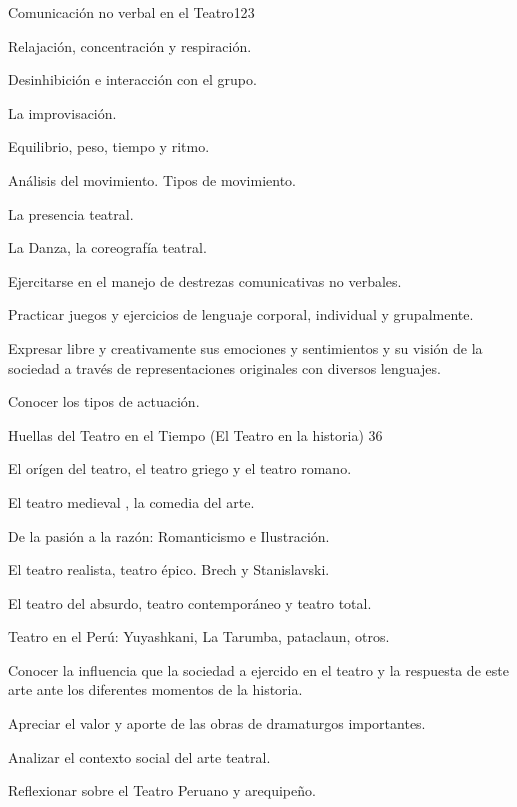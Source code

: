 \begin{syllabus}
\begin{unit}{Comunicación no verbal en el Teatro}{}{12}{3}
\begin{topics}
	\item Relajación, concentración y respiración.
	\item Desinhibición e interacción con el grupo.
	\item La improvisación. 
	\item Equilibrio, peso, tiempo y ritmo. 
	\item Análisis del movimiento. Tipos de movimiento.
	\item La presencia teatral.
	\item La Danza, la coreografía teatral.     

\end{topics}
\begin{learningoutcomes}
	\item Ejercitarse en el manejo de destrezas comunicativas no verbales.
	\item Practicar juegos y ejercicios de lenguaje  corporal, individual y grupalmente.
	\item Expresar libre y creativamente sus emociones y sentimientos y su visión de la sociedad  a través de representaciones originales con diversos lenguajes. 
	\item Conocer los tipos de actuación.
\end{learningoutcomes}
\end{unit}

\begin{unit}{Huellas del Teatro en el Tiempo  (El Teatro en la historia) }{}{3}{6}
\begin{topics}
	\item El orígen del teatro, el teatro griego y el teatro romano.
	\item El teatro medieval , la comedia del arte.
	\item De la pasión a la razón: Romanticismo e Ilustración.
	\item El teatro realista, teatro épico. Brech  y  Stanislavski.
	\item El teatro del absurdo, teatro contemporáneo y teatro total.
	\item Teatro en el Perú: Yuyashkani, La Tarumba, pataclaun, otros.
\end{topics}
\begin{learningoutcomes}
	\item Conocer la influencia que la sociedad a ejercido en el teatro y la respuesta de este arte ante los diferentes momentos de la historia.
	\item Apreciar el valor y aporte de las obras de dramaturgos importantes. 
	\item Analizar el contexto social del arte teatral.
	\item Reflexionar sobre el Teatro Peruano y arequipeño.
\end{learningoutcomes}
\end{unit}


\end{syllabus}
